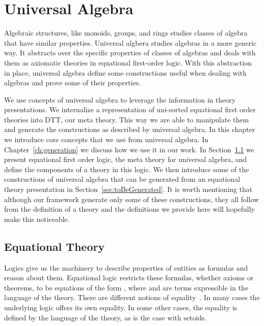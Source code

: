 \chapter{Universal Algebra}
\label{ch:ualgebra}
Algebraic structures, like monoids, groups, and rings studies classes of algebra that have similar properties. Universal algbera studies algebras in a more generic way. It abstracts over the specific properties of classes of algebras and deals with them as axiomatic theories in equational first-order logic. With this abstraction in place, universal algebra define some constructions useful when dealing with algebras and prove some of their properties.

We use concepts of universal algebra to leverage the information in theory presentations. We internalize a representation of uni-sorted equational first order theories into DTT, our meta theory. This way we are able to manipulate them and generate the constructions as described by universal algebra. In this chapter we introduce core concepts that we use from universal algebra. In Chapter~\ref{ch:generation} we discuss how we use it in our work. In Section~\ref{sec:eqtheory} we present equational first order logic, the meta theory for universal algebra, and define the components of a theory in this logic. We then introduce some of the constructions of universal algebra that can be generated from an equational theory presentation in Section~\ref{sec:toBeGenerated}. It is worth mentioning that although our framework generate only some of these constructions, they all follow from the definition of a theory and the definitions we provide here will hopefully make this noticeable.   

\section{Equational Theory}
\label{sec:eqtheory}
Logics give us the machinery to describe properties of entities as formulas and reason about them.  
Equational logic restricts these formulas, whether axioms or theorems, to be equations of the form , where  and   are terms expressible in the language of the theory. There are different notions of equality~\cite{oneThingSame2008, equalityInTPs2015}. In many cases the underlying logic offers its own equality. In some other cases, the equality is defined by the language of the theory, as is the case with setoids. 

